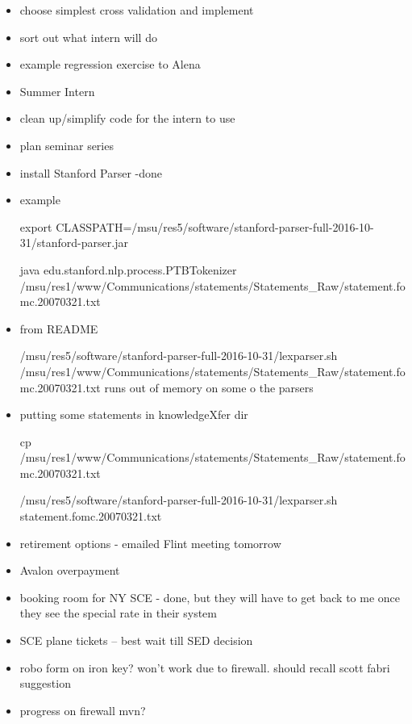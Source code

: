 \documentclass[hyperref]{labbook}
\begin{document}
\begin{itemize}
  \item choose simplest cross validation and implement
  \item sort out what intern will do
  \item example regression exercise to Alena
\item Summer Intern
\item clean up/simplify code for the intern to use
\end{itemize}


\begin{itemize}
\item plan seminar series
\end{itemize}


\begin{itemize}
\item install Stanford Parser -done
\item example

export CLASSPATH=/msu/res5/software/stanford-parser-full-2016-10-31/stanford-parser.jar

java edu.stanford.nlp.process.PTBTokenizer /msu/res1/www/Communications/statements/Statements\_Raw/statement.fomc.20070321.txt

\item from README

/msu/res5/software/stanford-parser-full-2016-10-31/lexparser.sh /msu/res1/www/Communications/statements/Statements\_Raw/statement.fomc.20070321.txt
 runs out of memory on some o the parsers

\item  putting some statements in knowledgeXfer dir

cp /msu/res1/www/Communications/statements/Statements\_Raw/statement.fomc.20070321.txt  

/msu/res5/software/stanford-parser-full-2016-10-31/lexparser.sh statement.fomc.20070321.txt
\end{itemize}


\begin{itemize}
\item retirement options - emailed Flint meeting tomorrow
\item Avalon overpayment
\item booking room for NY SCE - done, but they will have to get back to me once they see the special rate  in their system
\item SCE plane tickets -- best wait till SED decision
\item robo form on iron key?  won't work due to firewall.  should recall scott fabri suggestion
\item progress on firewall mvn?
\end{itemize}
\end{document}
